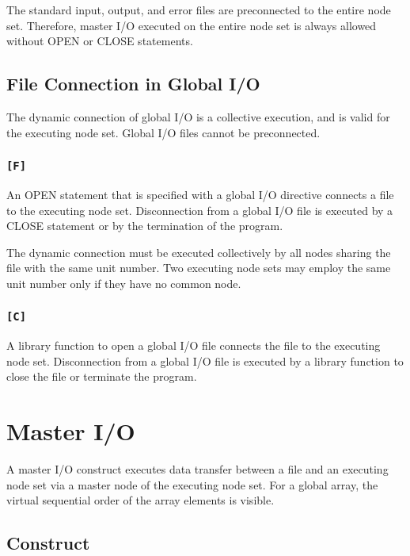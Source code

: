   The standard input, output, and error files are preconnected to the
  entire node set.
  Therefore, master I/O executed on the entire node set is always
  allowed without OPEN or CLOSE statements.


  \subsection{File Connection in Global I/O}

  The dynamic connection of global I/O is a collective execution, and
  is valid for the executing node set.
  Global I/O files cannot be preconnected.

  \subsubsection*{\tt [F]}

  An OPEN statement that is specified with a global I/O directive connects a
  file to the executing node set.
  Disconnection from a global I/O file is executed by a CLOSE statement
  or by the termination of the program.

  The dynamic connection must be executed collectively by all nodes sharing
  the file with the same unit number.
  Two executing node sets may employ the same unit number only if they
  have no common node.

  \subsubsection*{\tt [C]}

  A library function to open a global I/O file connects the file to the
  executing node set.
  Disconnection from a global I/O file is executed by a library function
  to close the file or terminate the program.

  \section{Master I/O}

  A master I/O construct executes data transfer between a file and an
  executing node set via a master node of the executing node set.
  For a global array, the virtual sequential order of the array elements
  is visible.

  \subsection{\mio Construct}
  
